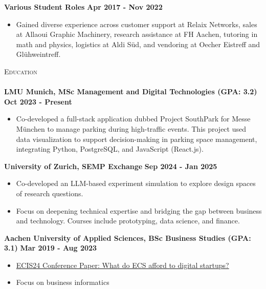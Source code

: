 \documentclass[a4paper]{article}
\newcommand{\lineunder} {
    \vspace*{-8pt} \\
    \hspace*{-18pt} \hrulefill \\
}
\newcommand{\header} [1] {
    {\hspace*{-18pt}\vspace*{6pt} \textsc{#1}}
    \vspace*{-6pt} \lineunder
}
\begin{document}
\vspace{-2mm}
\textbf{Various Student Roles} \hfill \textbf{ Apr 2017 - Nov 2022}\\
\vspace{-2mm}
\begin{itemize} \itemsep -2pt
    \item Gained diverse experience across customer support at Relaix Networks, sales at Allaoui Graphic Machinery, research assistance at FH Aachen, tutoring in math and physics, logistics at Aldi Süd, and vendoring at Oecher Eistreff and Glühweintreff.
\end{itemize}

\header{Education}
\textbf{LMU Munich, MSc Management and Digital Technologies (GPA: 3.2)}\hfill \textbf{ Oct 2023 - Present}\\
\vspace{-2mm}
\begin{itemize} \itemsep -2pt
	\item Co-developed a full-stack application dubbed Project SouthPark for Messe München to manage parking during high-traffic events. This project used data visualization to support decision-making in parking space management, integrating Python, PostgreSQL, and JavaScript (React.js).
\end{itemize}
\vspace{-2mm}
\textbf{University of Zurich, SEMP Exchange}\hfill \textbf{ Sep 2024 - Jan 2025}\\
\vspace{-2mm}
\begin{itemize} \itemsep -2pt
    \item Co-developed an LLM-based experiment simulation to explore design spaces of research questions. 
	\item Focus on deepening technical expertise and bridging the gap between business and technology. Courses include prototyping, data science, and finance.
\end{itemize}
\vspace{-2mm}
\textbf{Aachen University of Applied Sciences, BSc Business Studies (GPA: 3.1)}\hfill \textbf{ Mar 2019 - Aug 2023}\\
\vspace{-2mm}
\begin{itemize} \itemsep -2pt
	\item \href {https://aisel.aisnet.org/ecis2024/track24_socialmedia/track24_socialmedia/6/}  {ECIS24 Conference Paper: What do ECS afford to digital startups?}
	\item Focus on business informatics
\end{itemize}
\end{document}
